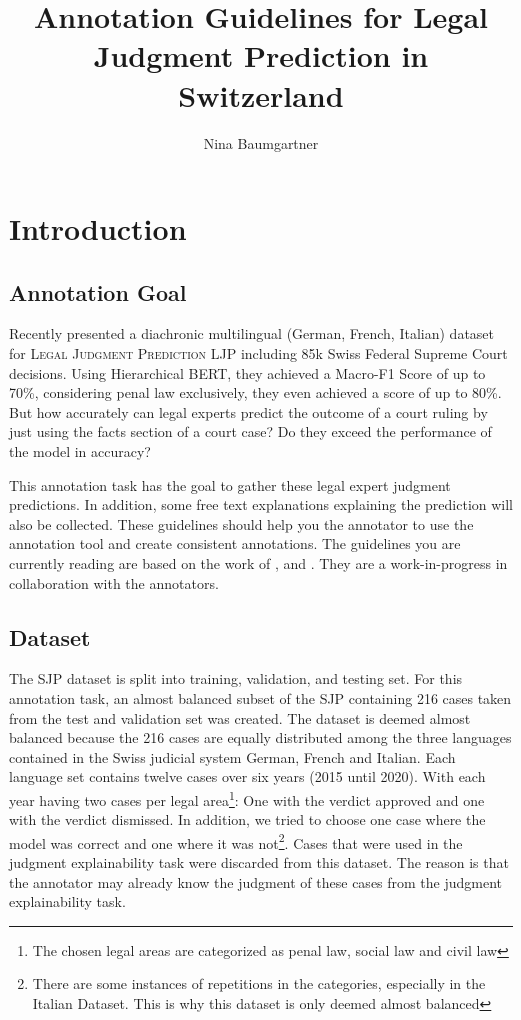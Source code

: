 \documentclass{article}
\title{Annotation Guidelines for Legal Judgment Prediction in Switzerland}
\author{Nina Baumgartner}
\date{} %
\begin{document}
\maketitle
\section{Introduction}
\subsection{Annotation Goal}
Recently  \citet{Niklaus_2021} presented a diachronic multilingual (German, French, Italian) dataset for \textsc{Legal Judgment Prediction} LJP including 85k Swiss Federal Supreme Court decisions. Using Hierarchical BERT, they achieved a Macro-F1 Score of up to 70\%, considering penal law exclusively, they even achieved a score of up to 80\%. But how accurately can legal experts predict the outcome of a court ruling by just using the facts section of a court case? Do they exceed the performance of the model in accuracy?

This annotation task has the goal to gather these legal expert judgment predictions. In addition, some free text explanations explaining the prediction will also be collected. These guidelines should help you the annotator to use the annotation tool and create consistent annotations. The guidelines you are currently reading are based on the work of \cite{Reiter+2020+193+202}, \cite{Leitner_2019} and \cite{pustejovsky2012natural}. They are a work-in-progress in collaboration with the annotators.

\subsection{Dataset}
The SJP dataset is split into training, validation, and testing set. For this annotation task, an almost balanced subset of the SJP containing 216 cases taken from the test and validation set was created. The dataset is deemed almost balanced because the 216 cases are equally distributed among the three languages contained in the Swiss judicial system German, French and Italian. Each language set contains twelve cases over six years (2015 until 2020). With each year having two cases per legal area\footnote{The chosen legal areas are categorized as penal law, social law and civil law}: One with the verdict approved and one with the verdict dismissed. In addition, we tried to choose one case where the model was correct and one where it was not\footnote{There are some instances of repetitions in the categories, especially in the Italian Dataset. This is why this dataset is only deemed almost balanced}. Cases that were used in the judgment explainability task were discarded from this dataset. The reason is that the annotator may already know the judgment of these cases from the judgment explainability task.
\end{document}
